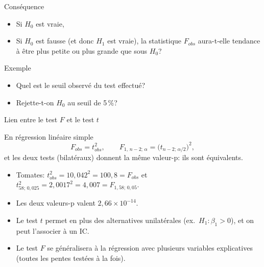 \documentclass{BeamerTemplate}
\begin{document}
\begin{frame}[t]{Conséquence}

\begin{itemize}\itemsep2.5cm
  \item Si $H_0$ est vraie,
  \item Si $H_0$ est fausse (et donc $H_1$ est vraie), la statistique $F_{obs}$
  aura-t-elle tendance à être plus petite ou plus grande que sous $H_0$?
\end{itemize}

\end{frame}

\begin{frame}[t]{Exemple}

\begin{itemize}\itemsep2cm
  \item Quel est le seuil observé du test effectué?
  \item Rejette-t-on $H_0$ au seuil de 5\,\%?
\end{itemize}

\end{frame}

\begin{frame}[t]{Lien entre le test $F$ et le test $t$}

\begin{Boite}{En régression linéaire simple}
\[
F_{obs}=t_{obs}^2,\qquad F_{1,\,n-2;\,\alpha}=\bigl(t_{n-2;\,\alpha/2}\bigr)^2,
\]
et les deux tests (bilatéraux) donnent \alert{la même valeur-p}: ils sont
équivalents.
\end{Boite}

\begin{itemize}\itemsep1.5mm
  \item Tomates: $t_{obs}^2=10{,}042^2=100{,}8=F_{obs}$ et
  $t_{58;\,0{,}025}^2=2{,}0017^2=4{,}007=F_{1,58;\,0{,}05}$.
  \item Les deux valeurs-p valent $2{,}66\times10^{-14}$.
  \item<2-> Le test $t$ permet en plus des alternatives \alert{unilatérales}
  (ex.\ $H_1:\beta_1>0$), et on peut l'associer à un IC.
  \item<2-> Le test $F$ se généralisera à la régression avec \alert{plusieurs}
  variables explicatives (toutes les pentes testées à la fois).
\end{itemize}

\end{frame}
\end{document}
